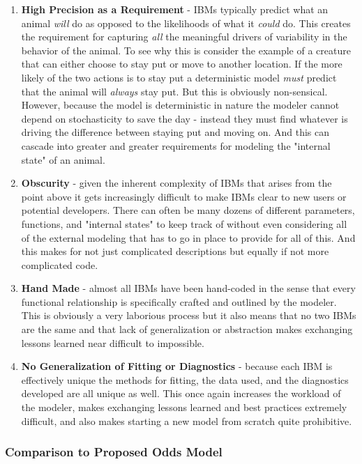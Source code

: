 \documentclass[11pt]{article}
\begin{document}
\begin{enumerate}
\item \textbf{High Precision as a Requirement} - IBMs typically predict what an animal \textit{will} do as opposed to the likelihoods of what it \textit{could} do. This creates the requirement for capturing \textit{all} the meaningful drivers of variability in the behavior of the animal. To see why this is consider the example of a creature that can either choose to stay put or move to another location. If the more likely of the two actions is to stay put a deterministic model \textit{must} predict that the animal will \textit{always} stay put. But this is obviously non-sensical. However, because the model is deterministic in nature the modeler cannot depend on stochasticity to save the day - instead they must find whatever is driving the difference between staying put and moving on. And this can cascade into greater and greater requirements for modeling the "internal state" of an animal. 
\item \textbf{Obscurity} - given the inherent complexity of IBMs that arises from the point above it gets increasingly difficult to make IBMs clear to new users or potential developers. There can often be many dozens of different parameters, functions, and "internal states" to keep track of without even considering all of the external modeling that has to go in place to provide for all of this. And this makes for not just complicated descriptions but equally if not more complicated code.
\item \textbf{Hand Made} - almost all IBMs have been hand-coded in the sense that every functional relationship is specifically crafted and outlined by the modeler. This is obviously a very laborious process but it also means that no two IBMs are the same and that lack of generalization or abstraction makes exchanging lessons learned near difficult to impossible. 
\item \textbf{No Generalization of Fitting or Diagnostics} - because each IBM is effectively unique the methods for fitting, the data used, and the diagnostics developed are all unique as well. This once again increases the workload of the modeler, makes exchanging lessons learned and best practices extremely difficult, and also makes starting a new model from scratch quite prohibitive. 
\end{enumerate}

\subsubsection{Comparison to Proposed Odds Model}
\end{document}
